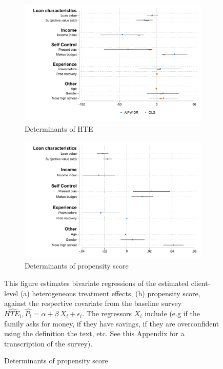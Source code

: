 \begin{figure}[H]
    \caption{Determinants of treatment effects and probability of choosing commitment}
    \label{determinants_ps_hte}
    \begin{center}
    \begin{subfigure}{0.475\textwidth}
        \caption{Determinants of HTE}
        \centering
        \includegraphics[width=\textwidth]{Figuras/HE/he_int_vertical_apr_pro_2.pdf}
    \end{subfigure}
    \begin{subfigure}{0.475\textwidth}
        \caption{Determinants of propensity score}
        \centering
        \includegraphics[width=\textwidth]{Figuras/HE/ps_int_vertical_pr_gbc_1.pdf}
    \end{subfigure}
  
    \end{center}
     \scriptsize   This figure estimates bivariate regressions of the estimated client-level (a) heterogeneous treatment effects, (b) propensity score, against the respective covariate from the baseline survey  $\widehat{HTE_i}, \widehat{P_i} = \alpha + \beta \: X_i + \epsilon_i$. The regressors $X_i$ include (e.g if the family asks for money, if they have savings, if they are overconfident using the definition the text, etc. See this Appendix for a transcription of the survey). \\
\end{figure}




